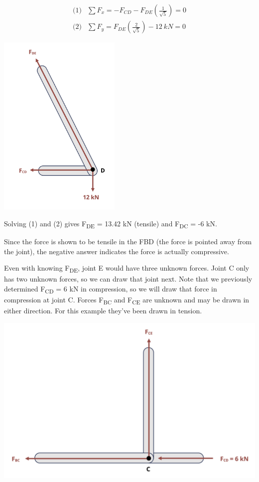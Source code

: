 \documentclass[
  letterpaper,
  DIV=11,
  numbers=noendperiod]{scrreprt}
\begin{document}
\begin{tcolorbox}
\begin{tcolorbox}
\[
\begin{aligned}
\text{(1)} & \sum F_x=-F_{C D}-F_{D E}\left(\frac{1}{\sqrt{5}}\right)=0 \\
\text{(2)} & \sum F_y=F_{D E}\left(\frac{2}{\sqrt{5}}\right)-12{~kN}=0
\end{aligned}
\]

\begin{center}
\includegraphics[width=2.3125in,height=\textheight]{images/CH1 PNGs/example 1.4 part 2.png}
\end{center}

Solving (1) and (2) gives F\textsubscript{DE} = 13.42 kN (tensile) and
F\textsubscript{DC} = -6 kN.

Since the force is shown to be tensile in the FBD (the force is pointed
away from the joint), the negative answer indicates the force is
actually compressive.

Even with knowing F\textsubscript{DE}, joint E would have three unknown
forces. Joint C only has two unknown forces, so we can draw that joint
next. Note that we previously determined F\textsubscript{CD} = 6 kN in
compression, so we will draw that force in compression at joint C.
Forces F\textsubscript{BC} and F\textsubscript{CE} are unknown and may
be drawn in either direction. For this example they've been drawn in
tension.

\begin{center}
\includegraphics[width=5.34375in,height=\textheight]{images/CH1 PNGs/example 1.4 part 3.png}
\end{center}


\end{tcolorbox}
\end{tcolorbox}
\end{document}
